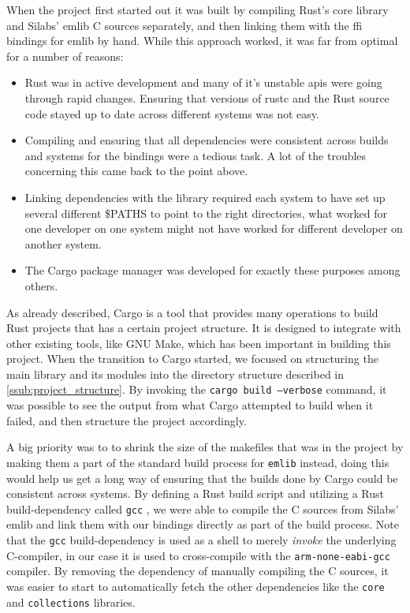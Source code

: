 When the project first started out it was built by compiling Rust's core library and Silabs' emlib C sources separately, and then linking them with the \gls{ffi} bindings for emlib by hand.
While this approach worked, it was far from optimal for a number of reasons:

\begin{itemize}
    \item Rust was in active development and many of it's unstable \glspl{api} were going through rapid changes. Ensuring that versions of rustc and the Rust source code stayed up to date across different systems was not easy.
    \item Compiling and ensuring that all dependencies were consistent across builds and systems for the bindings were a tedious task. A lot of the troubles concerning this came back to the point above.
    \item Linking dependencies with the library required each system to have set up several different \$PATHS to point to the right directories, what worked for one developer on one system might not have worked for different developer on another system.
    \item The Cargo package manager was developed for exactly these purposes among others.
\end{itemize}

As already described, Cargo is a tool that provides many operations to build Rust projects that has a certain project structure.
It is designed to integrate with other existing tools, like GNU Make, which has been important in  building this project.
When the transition to Cargo started, we focused on structuring the main library and its modules into the directory structure described in \autoref{ssub:project_structure}.
By invoking the \texttt{cargo build --verbose} command, it was possible to see the output from what Cargo attempted to build when it failed, and then structure the project accordingly.

A big priority was to to shrink the size of the makefiles that was in the project by making them a part of the standard build process for \texttt{emlib} instead, doing this would help us get a long way of ensuring that the builds done by Cargo could be consistent across systems.
By defining a Rust build script and utilizing a Rust build-dependency called \texttt{gcc} \cite{web:cargo_gcc}, we were able to compile the C sources from Silabs' emlib and link them with our bindings directly as part of the build process.
Note that the \texttt{gcc} build-dependency is used as a shell to merely \emph{invoke} the underlying C-compiler, in our case it is used to cross-compile with the \texttt{arm-none-eabi-gcc} compiler.
By removing the dependency of manually compiling the C sources, it was easier to start to automatically fetch the other dependencies like the \texttt{core} and \texttt{collections} libraries.

